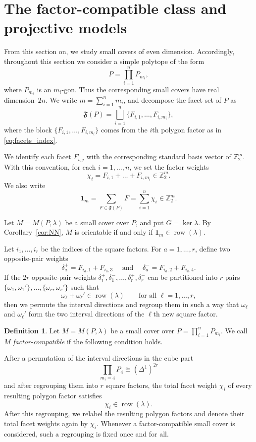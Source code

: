 \documentclass{amsart}
\numberwithin{equation}{section}
\theoremstyle{definition}
\newtheorem{definition}[theorem]{Definition}
\theoremstyle{remark}
\newcommand{\Z}{\mathbb Z}
\newcommand{\fF}{\mathfrak F}
\newcommand{\one}{\mathbf 1}
\DeclareMathOperator{\row}{row}
\begin{document}
\section{The factor-compatible class and projective models}\label{sec-products}

From this section on, we study small covers of even dimension.
Accordingly, throughout this section we consider a simple polytope of the form
$$
    P=\prod_{i=1}^n P_{m_i},
$$
where $P_{m_i}$ is an $m_i$-gon.
Thus the corresponding small covers have real dimension~$2n$.
We write $m=\sum_{i=1}^n m_i$, and decompose the facet set of $P$ as
$$
    \fF(P)=\bigsqcup_{i=1}^n \{F_{i,1},\dots,F_{i,m_i}\},
$$
where the block $\{F_{i,1},\dots,F_{i,m_i}\}$ comes from the $i$th polygon factor as in \eqref{eq:facets_index}.

We identify each facet $F_{i,j}$ with the corresponding standard basis vector of $\Z_2^m$.
With this convention, for each $i=1, \ldots, n$, we set the factor weights
$$
    \chi_i = F_{i,1}+ \dots + F_{i,m_i} \in \Z_2^m.
$$
We also write
$$
    \one_m= \sum_{F \in \fF(P)} F = \sum_{i=1}^n \chi_i \in \Z_2^m.
$$

Let $M=M(P,\lambda)$ be a small cover over $P$, and put $G=\ker\lambda$.
By Corollary~\ref{cor:NN}, $M$ is orientable if and only if $\one_m \in \row(\lambda)$.

Let $i_1, \ldots, i_r$ be the indices of the square factors.
For $a=1,\ldots, r$, define two opposite-pair weights
$$
    \delta_a^+=F_{{i_a},1}+F_{{i_a},3} \quad \text{ and } \quad \delta_a^-=F_{{i_a},2}+F_{{i_a},4}.
$$
If the $2r$ opposite-pair weights $\delta_1^+,\delta_1^-, \ldots, \delta_r^+,\delta_r^-$ can be partitioned into $r$ pairs $\{\omega_1,\omega_1'\},\dots,\{\omega_r,\omega_r'\}$ such that
$$
    \omega_\ell+\omega_\ell'\in \row(\lambda) \qquad  \text{for all } \ell=1,\dots,r,
$$
then we permute the interval directions and regroup them in such a way that $\omega_\ell$ and $\omega_\ell'$ form the two interval directions of the $\ell$th new square factor.

\begin{definition}\label{def:factor-compatible}
Let $M=M(P,\lambda)$ be a small cover over $P=\prod_{i=1}^n P_{m_i}$. 
We call $M$ \emph{factor-compatible} if the following condition holds.

After a permutation of the interval directions in the cube part
$$
    \prod_{m_i=4} P_4 \cong (\Delta^1)^{2r}
$$
and after regrouping them into $r$ square factors, the total facet weight $\chi_i$ of every resulting polygon factor satisfies
$$
    \chi_i\in\row(\lambda).
$$
After this regrouping, we relabel the resulting polygon factors and denote their total facet weights again by $\chi_i$.
Whenever a factor-compatible small cover is considered, such a regrouping is fixed once and for all.
\end{definition}
\end{document}
